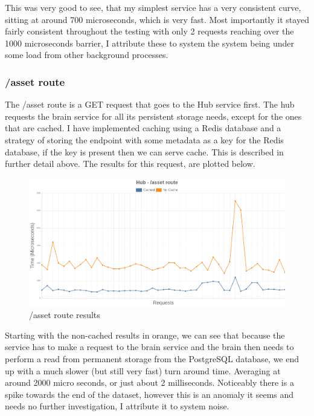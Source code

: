 \documentclass[titlepage]{article}
\begin{document}
This was very good to see, that my simplest service has a very consistent curve, sitting at around 700 microseconds, which is very fast. Most importantly it stayed fairly consistent throughout the testing with only 2 requests reaching over the 1000 microseconds barrier, I attribute these to system the system being under some load from other background processes.

\pagebreak
\subsubsection{/asset route}
The /asset route is a GET request that goes to the Hub service first. The hub requests the brain service for all its persistent storage needs, except for the ones that are cached. I have implemented caching using a Redis database and a strategy of storing the endpoint with some metadata as a key for the Redis database, if the key is present then we can serve cache. This is described in further detail above. The results for this request, are plotted below.

\begin{figure}[h!]
\includegraphics[width=\textwidth]{../results/asset.png}
  \caption{/asset route results}
\end{figure}

Starting with the non-cached results in orange, we can see that because the service has to make a request to the brain service and the brain then needs to perform a read from permanent storage from the PostgreSQL database, we end up with a much slower (but still very fast) turn around time. Averaging at around 2000 micro seconds, or just about 2 milliseconds. Noticeably there is a spike towards the end of the dataset, however this is an anomaly it seems and needs no further investigation, I attribute it to system noise. \\
\end{document}
